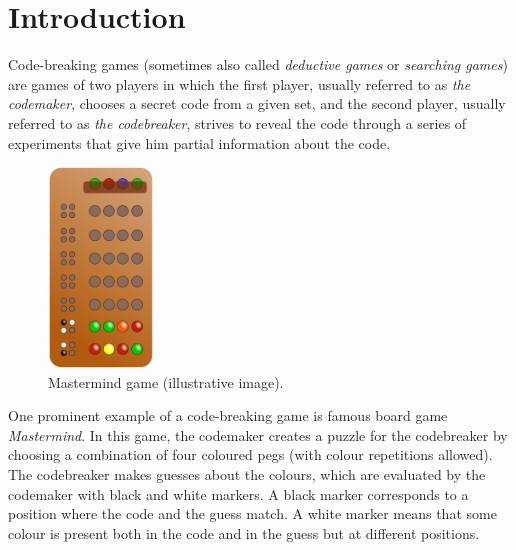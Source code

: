  \chapter{Introduction}


Code-breaking games (sometimes also called \emph{deductive games} or \emph{searching games})
  are games of two players in which the first player,
  usually referred to as \emph{the codemaker},
    chooses a secret code from a given set, and the second player,
  usually referred to as \emph{the codebreaker},
    strives to reveal the code through a series
    of experiments that give him partial information about the code.

\begin{figure}
  \vspace{-5mm}
  \begin{center}
  \includegraphics[width=0.25\textwidth]{pictures/mastermind.png}
  \vspace{-5mm}
  \end{center}
  \caption{Mastermind game (illustrative image)\protect\footnotemark.}
  \vspace{-5mm}
\end{figure}

One prominent example of a code-breaking game is famous board game
  \emph{Mastermind}.
In this game, the codemaker creates a puzzle for the codebreaker by choosing a
  combination of four coloured pegs (with colour repetitions allowed).
The codebreaker makes guesses about the colours, which are evaluated by the codemaker with
  black and white markers.
A black marker corresponds to a position where the code and the guess match.
A white marker means that some colour is present both in the code
  and in the guess but at different positions.

